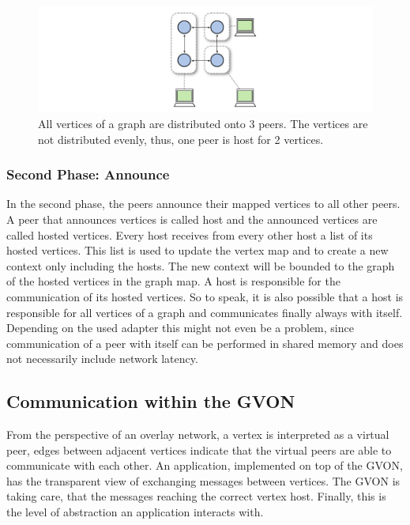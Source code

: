 \begin{figure}[H]
  \centering \includegraphics[width=\textwidth]{graphics/30_gvon_mapping}
  \caption{All vertices of a graph are distributed onto 3 peers. The
    vertices are not distributed evenly, thus, one peer is host for 2
    vertices.}
  \label{fig:gvon_mapping}
\end{figure}

\subsubsection*{Second Phase: Announce}
In the second phase, the peers announce their mapped vertices to all
other peers.  A peer that announces vertices is called host and the
announced vertices are called hosted vertices.  Every host receives
from every other host a list of its hosted vertices.  This list is
used to update the vertex map and to create a new context only
including the hosts. The new context will be bounded to the graph of
the hosted vertices in the graph map.  A host is responsible for the
communication of its hosted vertices.  So to speak, it is also
possible that a host is responsible for all vertices of a graph and
communicates finally always with itself.  Depending on the used
adapter this might not even be a problem, since communication of a
peer with itself can be performed in shared memory and does not
necessarily include network latency.


\subsection{Communication within the GVON}
From the perspective of an overlay network, a vertex is interpreted as
a virtual peer, edges between adjacent vertices indicate that the
virtual peers are able to communicate with each other. An application,
implemented on top of the GVON, has the transparent view of exchanging
messages between vertices. The GVON is taking care, that the messages
reaching the correct vertex host.  Finally, this is the level of
abstraction an application interacts with.

